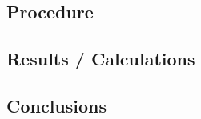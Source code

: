 \documentclass[notitlepage, 12pt]{report}  %
\begin{document}
\subsection*{Procedure}

\subsection*{Results / Calculations}

\subsection*{Conclusions}
\newpage

\printbibliography[title={\Large References}] %
\end{document}
